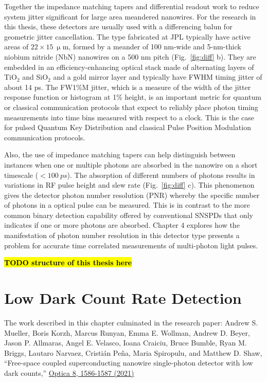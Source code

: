 \documentclass[11pt]{caltech_thesis} %
\begin{document}
Together the impedance matching tapers and differential readout work to reduce system jitter significant for large area meandered nanowires. For the research in this thesis, these detectors are usually used with a differencing balun for geometric jitter cancellation. The type fabricated at JPL typically have active areas of $22 \times 15 \ \mathrm{\upmu m}$, formed by a meander of 100 nm-wide and 5-nm-thick niobium nitride (NbN) nanowires on a 500 nm pitch (Fig.~\ref{fig:diff} b). They are embedded in an efficiency-enhancing optical stack made of alternating layers of TiO$_2$ and SiO$_2$ and a gold mirror layer and typically have FWHM timing jitter of about 14 ps. The FW1\%M jitter, which is a measure of the width of the jitter response function or histogram at 1\% height, is an important metric for quantum or classical communication protocols that expect to reliably place photon timing measurements into time bins measured with respect to a clock. This is the case for pulsed Quantum Key Distribution and classical Pulse Position Modulation communication protocols.

Also, the use of impedance matching tapers can help distinguish between instances when one or multiple photons are absorbed in the nanowire on a short timescale ($< 100~ps$). The absorption of different numbers of photons results in variations in RF pulse height and slew rate (Fig.~\ref{fig:diff} c). This phenomenon gives the detector photon number resolution (PNR) whereby the specific number of photons in a optical pulse can be measured. This is in contrast to the more common binary detection capability offered by conventional SNSPDs that only indicates if one or more photons are absorbed. Chapter 4 explores how the manifestation of photon number resolution in this detector type presents a problem for accurate time correlated measurements of multi-photon light pulses.

\textbf{\hl{TODO structure of this thesis here}}

\hypertarget{low-dark-count-rate-detection}{%
\chapter{Low Dark Count Rate Detection}\label{low-dark-count-rate-detection}}

The work described in this chapter culminated in the research paper: Andrew S. Mueller, Boris Korzh, Marcus Runyan, Emma E. Wollman, Andrew D. Beyer, Jason P. Allmaras, Angel E. Velasco, Ioana Craiciu, Bruce Bumble, Ryan M. Briggs, Lautaro Narvaez, Cristián Peña, Maria Spiropulu, and Matthew D. Shaw, ``Free-space coupled superconducting nanowire single-photon detector with low dark counts,'' \href{https://opg.optica.org/optica/fulltext.cfm?uri=optica-8-12-1586\&id=465726}{Optica 8, 1586-1587 (2021)}
\end{document}
